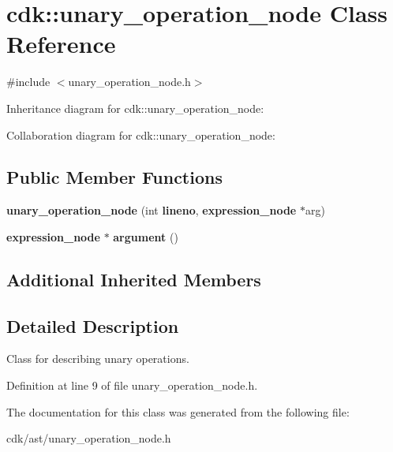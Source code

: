 \section{cdk\+:\+:unary\+\_\+operation\+\_\+node Class Reference}
\label{classcdk_1_1unary__operation__node}


{\ttfamily \#include $<$unary\+\_\+operation\+\_\+node.\+h$>$}



Inheritance diagram for cdk\+:\+:unary\+\_\+operation\+\_\+node\+:


Collaboration diagram for cdk\+:\+:unary\+\_\+operation\+\_\+node\+:
\subsection*{Public Member Functions}
\begin{DoxyCompactItemize}
\item 
\mbox{\label{classcdk_1_1unary__operation__node_ac9ccc3c47c8e053261ea06a0fff6ba9d}} 
{\bfseries unary\+\_\+operation\+\_\+node} (int \textbf{ lineno}, \textbf{ expression\+\_\+node} $\ast$arg)
\item 
\mbox{\label{classcdk_1_1unary__operation__node_ad3218f66edaee9395d6919470c09e6df}} 
\textbf{ expression\+\_\+node} $\ast$ {\bfseries argument} ()
\end{DoxyCompactItemize}
\subsection*{Additional Inherited Members}


\subsection{Detailed Description}
Class for describing unary operations. 

Definition at line 9 of file unary\+\_\+operation\+\_\+node.\+h.



The documentation for this class was generated from the following file\+:\begin{DoxyCompactItemize}
\item 
cdk/ast/unary\+\_\+operation\+\_\+node.\+h\end{DoxyCompactItemize}
